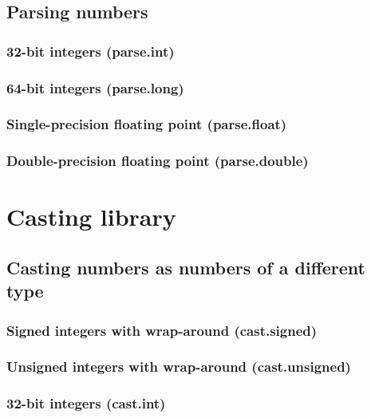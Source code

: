 \documentclass{article}
\theoremstyle{definition}
\begin{document}
\subsection{Parsing numbers}

\subsubsection{32-bit integers (parse.int)}

\subsubsection{64-bit integers (parse.long)}

\subsubsection{Single-precision floating point (parse.float)}

\subsubsection{Double-precision floating point (parse.double)}

\pagebreak

\section{Casting library}

\subsection{Casting numbers as numbers of a different type}

\subsubsection{Signed integers with wrap-around (cast.signed)}

\subsubsection{Unsigned integers with wrap-around (cast.unsigned)}

\subsubsection{32-bit integers (cast.int)}
\end{document}
